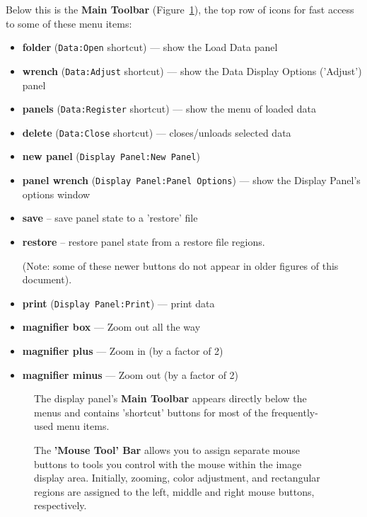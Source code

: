Below this is the {\bf Main Toolbar} (Figure~\ref{fig:viewer_maintoolbar}),
the top row of icons for fast access to some of these menu items:
\begin{itemize}
   \item {\bf folder} ({\tt Data:Open} shortcut) --- show the Load Data panel
   \item {\bf wrench} ({\tt Data:Adjust} shortcut) --- show the Data Display
              Options ('Adjust') panel 
   \item {\bf panels} ({\tt Data:Register} shortcut) --- show the 
              menu of loaded data
   \item {\bf delete} ({\tt Data:Close} shortcut) --- closes/unloads 
              selected data
   \item {\bf new panel} ({\tt Display Panel:New Panel})
   \item {\bf panel wrench} ({\tt Display Panel:Panel Options}) --- show
              the Display Panel's options window 
   
   \item  {\bf save} -- save panel state to a 'restore' file
   \item  {\bf restore} -- restore panel state from a restore file
    regions.
    
    (Note: some of these newer buttons do not appear in older figures of
    this document).
   
   \item {\bf print} ({\tt Display Panel:Print}) --- print data
   \item {\bf magnifier box} --- Zoom out all the way
   \item {\bf magnifier plus} --- Zoom in (by a factor of 2)
   \item {\bf magnifier minus} --- Zoom out (by a factor of 2)
\end{itemize}

\begin{figure}[h!]
\begin{center}
\caption{\label{fig:viewer_maintoolbar} The display panel's
{\bf Main Toolbar} appears directly below the menus and contains
'shortcut' buttons for most of the frequently-used menu items.}
\hrulefill
\end{center}
\end{figure}

\begin{figure}[h!]
\begin{center}
\caption{\label{fig:viewer_mousetoolbar} The 
{\bf 'Mouse Tool' Bar} allows you to assign separate mouse buttons to
tools you control with the mouse within the image display area.  Initially,
zooming, color adjustment, and rectangular regions are assigned to the left,
middle and right mouse buttons,
respectively.}
\hrulefill
\end{center}
\end{figure}

